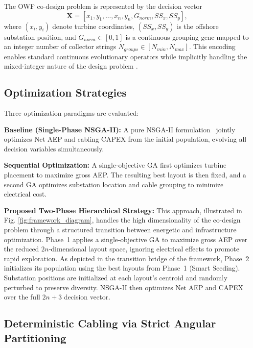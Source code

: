\documentclass[format=sigconf,anonymous=true,review=true]{acmart}
\begin{document}
The OWF co-design problem is represented by the decision vector
\begin{equation}
\mathbf{X} = [x_1, y_1, \dots, x_n, y_n, G_{norm}, SS_x, SS_y],
\end{equation}
where $(x_i, y_i)$ denote turbine coordinates, $(SS_x, SS_y)$ is the offshore substation position, and $G_{norm} \in [0,1]$ is a continuous grouping gene mapped to an integer number of collector strings $N_{groups} \in [N_{min}, N_{max}]$.  
This encoding enables standard continuous evolutionary operators while implicitly handling the mixed-integer nature of the design problem \cite{Haupt2004}.

\subsection{Optimization Strategies}

Three optimization paradigms are evaluated:

\textbf{Baseline (Single-Phase NSGA-II):}  
A pure NSGA-II formulation~\cite{Deb2002NSGA2} jointly optimizes Net AEP and cabling CAPEX from the initial population, evolving all decision variables simultaneously.

\textbf{Sequential Optimization:}  
A single-objective GA first optimizes turbine placement to maximize gross AEP. The resulting best layout is then fixed, and a second GA optimizes substation location and cable grouping to minimize electrical cost.

\textbf{Proposed Two-Phase Hierarchical Strategy:} 
This approach, illustrated in Fig. \ref{fig:framework_diagram}, handles the high dimensionality of the co-design problem through a structured transition between energetic and infrastructure optimization. 
Phase~1 applies a single-objective GA to maximize gross AEP over the reduced $2n$-dimensional layout space, ignoring electrical effects to promote rapid exploration.  
As depicted in the transition bridge of the framework, Phase~2 initializes its population using the best layouts from Phase~1 (Smart Seeding). Substation positions are initialized at each layout’s centroid and randomly perturbed to preserve diversity. NSGA-II then optimizes Net AEP and CAPEX over the full $2n+3$ decision vector.

\subsection{Deterministic Cabling via Strict Angular Partitioning}
\end{document}
